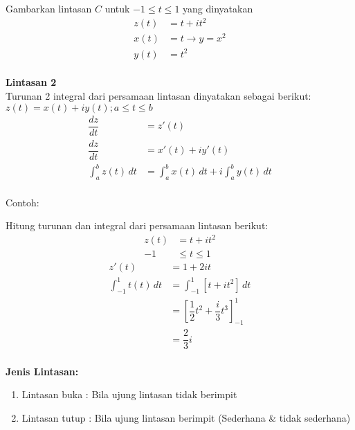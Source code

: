 \documentclass{article}
\begin{document}
Gambarkan lintasan  $C$ untuk $-1 \leq t \leq 1$ yang dinyatakan
\begin{align}
    z(t) & = t + it^2
    \nonumber                     \\
    x(t) & = t \rightarrow y= x^2
    \nonumber                     \\
    y(t) & = t^2
    \nonumber
\end{align}
\leavevmode\\

\textbf{Lintasan 2}
\\

Turunan 2 integral dari persamaan lintasan dinyatakan sebagai berikut:
$z(t) =x(t) +i y(t) ; a \leq t \leq b$
\begin{align}
    \dfrac{dz}{dt}         & = z'(t)
    \nonumber                                                                   \\
    \dfrac{dz}{dt}         & = x'(t) + iy'(t)
    \nonumber                                                                   \\
    \int_{a}^{b} z(t) \,dt & =\int_{a}^{b} x(t) \,dt + i \int_{a}^{b} y(t) \,dt
    \nonumber
\end{align}
\leavevmode\\

Contoh:

Hitung turunan dan integral dari persamaan lintasan berikut:
\begin{align}
    z(t) & = t + it^2
    \nonumber            \\
    -1   & \leq t \leq 1
    \nonumber
\end{align}
\begin{align}
    z'(t)                   & = 1 + 2it
    \nonumber                                                               \\
    \int_{-1}^{1} t(t) \,dt & = \int_{-1}^{1} [t + it^2] \,dt
    \nonumber                                                               \\
                            & = [\dfrac{1}{2}t^2 + \dfrac{i}{3}t^3]_{-1} ^1
    \nonumber                                                               \\
                            & = \dfrac{2}{3}i
    \nonumber
\end{align}
\leavevmode\\

\textbf{Jenis Lintasan:}
\begin{enumerate}
    \item Lintasan buka : Bila ujung lintasan tidak berimpit
    \item Lintasan tutup : Bila ujung lintasan berimpit (Sederhana \& tidak sederhana)
\end{enumerate}
\leavevmode\\
\end{document}
